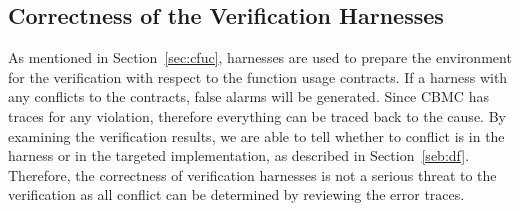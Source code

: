 \subsection{Correctness of the Verification Harnesses}
As mentioned in Section~\ref{sec:cfuc}, harnesses are used to prepare the environment for the verification with respect to the function usage contracts. If a harness with any conflicts to the contracts, false alarms will be generated. Since CBMC has traces for any violation, therefore everything can be traced back to the cause. By examining the verification results, we are able to tell whether to conflict is in the harness or in the targeted implementation, as described in Section~\ref{seb:df}. Therefore, the correctness of verification harnesses is not a serious threat to the verification as all conflict can be determined by reviewing the error traces.




